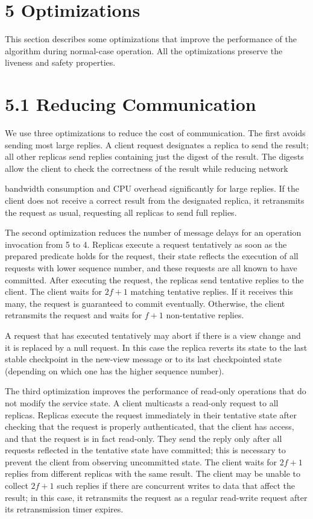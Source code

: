 \documentclass[
]{article}
\begin{document}
\section{5 Optimizations}\label{optimizations}

This section describes some optimizations that improve the performance
of the algorithm during normal-case operation. All the optimizations
preserve the liveness and safety properties.

\section{5.1 Reducing Communication}\label{reducing-communication}

We use three optimizations to reduce the cost of communication. The
first avoids sending most large replies. A client request designates a
replica to send the result; all other replicas send replies containing
just the digest of the result. The digests allow the client to check the
correctness of the result while reducing network

bandwidth consumption and CPU overhead significantly for large replies.
If the client does not receive a correct result from the designated
replica, it retransmits the request as usual, requesting all replicas to
send full replies.

The second optimization reduces the number of message delays for an
operation invocation from 5 to 4. Replicas execute a request tentatively
as soon as the prepared predicate holds for the request, their state
reflects the execution of all requests with lower sequence number, and
these requests are all known to have committed. After executing the
request, the replicas send tentative replies to the client. The client
waits for \(2f + 1\) matching tentative replies. If it receives this
many, the request is guaranteed to commit eventually. Otherwise, the
client retransmits the request and waits for \(f + 1\) non-tentative
replies.

A request that has executed tentatively may abort if there is a view
change and it is replaced by a null request. In this case the replica
reverts its state to the last stable checkpoint in the new-view message
or to its last checkpointed state (depending on which one has the higher
sequence number).

The third optimization improves the performance of read-only operations
that do not modify the service state. A client multicasts a read-only
request to all replicas. Replicas execute the request immediately in
their tentative state after checking that the request is properly
authenticated, that the client has access, and that the request is in
fact read-only. They send the reply only after all requests reflected in
the tentative state have committed; this is necessary to prevent the
client from observing uncommitted state. The client waits for \(2f+1\)
replies from different replicas with the same result. The client may be
unable to collect \(2f+1\) such replies if there are concurrent writes
to data that affect the result; in this case, it retransmits the request
as a regular read-write request after its retransmission timer expires.
\end{document}
